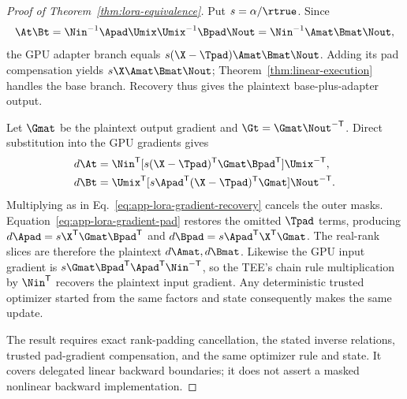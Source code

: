 \begin{proof}[Proof of Theorem~\ref{thm:lora-equivalence}]
Put $s=\alpha/\rtrue$.  Since
\begin{equation}
\At\Bt=\Nin^{-1}\Apad\Umix\Umix^{-1}\Bpad\Nout
=\Nin^{-1}\Amat\Bmat\Nout,
\end{equation}
the GPU adapter branch equals
$s(\X-\Tpad)\Amat\Bmat\Nout$.  Adding its pad compensation yields
$s\X\Amat\Bmat\Nout$; Theorem~\ref{thm:linear-execution} handles the base
branch.  Recovery thus gives the plaintext base-plus-adapter output.

Let $\Gmat$ be the plaintext output gradient and
$\Gt=\Gmat\Nout^{-\mathsf T}$.  Direct substitution into the GPU gradients
gives
\begin{align}
d\At&=\Nin^{\mathsf T}
 [s(\X-\Tpad)^{\mathsf T}\Gmat\Bpad^{\mathsf T}]
 \Umix^{-\mathsf T},\nonumber\\
d\Bt&=\Umix^{\mathsf T}
 [s\Apad^{\mathsf T}(\X-\Tpad)^{\mathsf T}\Gmat]
 \Nout^{-\mathsf T}.
\end{align}
Multiplying as in Eq.~\eqref{eq:app-lora-gradient-recovery} cancels the outer
masks.  Equation~\eqref{eq:app-lora-gradient-pad} restores the omitted
$\Tpad$ terms, producing
$d\Apad=s\X^{\mathsf T}\Gmat\Bpad^{\mathsf T}$ and
$d\Bpad=s\Apad^{\mathsf T}\X^{\mathsf T}\Gmat$.  The real-rank slices are
therefore the plaintext $d\Amat,d\Bmat$.  Likewise the GPU input gradient is
$s\Gmat\Bpad^{\mathsf T}\Apad^{\mathsf T}\Nin^{-\mathsf T}$, so the TEE's
chain rule multiplication by $\Nin^{\mathsf T}$ recovers the plaintext input
gradient.  Any deterministic trusted optimizer started from the same factors
and state consequently makes the same update.

The result requires exact rank-padding cancellation, the stated inverse
relations, trusted pad-gradient compensation, and the same optimizer rule and
state.  It covers delegated linear backward boundaries; it does not assert a
masked nonlinear backward implementation.
\end{proof}
